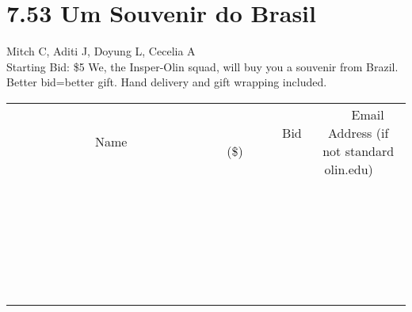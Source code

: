 \documentclass[11pt]{article}
\begin{document}
\section*{7.53 Um Souvenir do Brasil}
Mitch C, Aditi J, Doyung L, Cecelia A
\\
Starting Bid: \$5
\newline
We, the Insper-Olin squad, will buy you a souvenir from Brazil. Better bid=better gift. Hand delivery and gift wrapping included.
\\[6ex]
\begin{tabular}{c c c}
~~~~~~~~~~~~~Name~~~~~~~~~~~~~ & ~~~~~~~~~Bid (\$)~~~~~~~~~  & ~~~Email Address (if not standard olin.edu)~~~\\
 & & \\
\hline
 & & \\
\hline
 & & \\
\hline
 & & \\
\hline
 & & \\
\hline
 & & \\
\hline
 & & \\
\hline
 & & \\
\hline
 & & \\
\hline
 & & \\
\hline
 & & \\
\hline
 & & \\
\hline
 & & \\
\hline
 & & \\
\hline
 & & \\
\hline
 & & \\
\hline
 & & \\
\hline
 & & \\
\hline
 & & \\
\hline
 & & \\
\hline
 & & \\
\hline
 & & \\
\hline
 & & \\
\hline
 & & \\
\hline
 & & \\
\hline
 & & \\
\hline
\end{tabular}
\newpage
\end{document}
